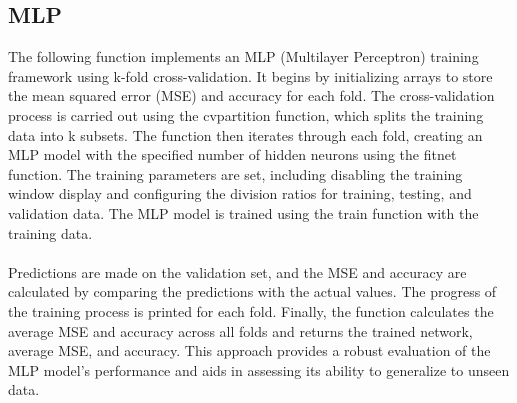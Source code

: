 \documentclass[]{article}
\begin{document}
	\subsection{MLP}
	The following function implements an MLP (Multilayer Perceptron) training framework using k-fold cross-validation. It begins by initializing arrays to store the mean squared error (MSE) and accuracy for each fold. The cross-validation process is carried out using the cvpartition function, which splits the training data into k subsets. The function then iterates through each fold, creating an MLP model with the specified number of hidden neurons using the fitnet function. The training parameters are set, including disabling the training window display and configuring the division ratios for training, testing, and validation data. The MLP model is trained using the train function with the training data. \\\\
	Predictions are made on the validation set, and the MSE and accuracy are calculated by comparing the predictions with the actual values. The progress of the training process is printed for each fold. Finally, the function calculates the average MSE and accuracy across all folds and returns the trained network, average MSE, and accuracy. This approach provides a robust evaluation of the MLP model's performance and aids in assessing its ability to generalize to unseen data.
	
\end{document}
